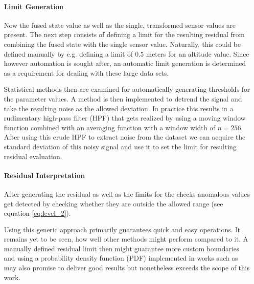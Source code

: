 \paragraph{Limit Generation}
Now the fused state value as well as the single, transformed sensor values are present. The next step consists of defining a limit for the resulting residual from combining the fused state with the single sensor value. Naturally, this could be defined manually by e.g. defining a limit of 0.5 meters for an altitude value. Since however automation is sought after, an automatic limit generation is determined as a requirement for dealing with these large data sets.

Statistical methods then are examined for automatically generating thresholds for the parameter values. A method is then implemented to detrend the signal and take the resulting noise as the allowed deviation. In practice this results in a rudimentary high-pass filter (HPF) that gets realized by using a moving window function combined with an averaging function with a window width of $n=256$. After using this crude HPF to extract noise from the dataset we can acquire the standard deviation of this noisy signal and use it to set the limit for resulting residual evaluation.


\paragraph{Residual Interpretation}

After generating the residual as well as the limits for the checks anomalous values get detected by checking whether they are outside the allowed range (see equation \ref{eq:level_2}).

Using this generic approach primarily guarantees quick and easy operations. It remains yet to be seen, how well other methods might perform compared to it. A manually defined residual limit then might guarantee more custom boundaries and using a probability density function (PDF) implemented in works such as \cite{svard_data-driven_2014} may also promise to deliver good results but nonetheless exceeds the scope of this work.



